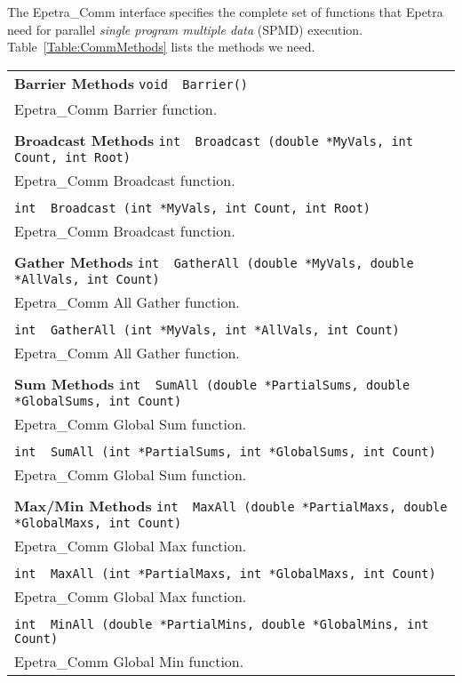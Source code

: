 \documentclass[12pt,relax]{EpetraUserGuide}
\newcommand{\comm}{Epetra\_Comm}
\begin{document}
The \comm{} interface specifies the complete set of functions that Epetra need
for parallel {\it single program multiple data} (SPMD) execution.
Table~\ref{Table:CommMethods} lists the methods we need.
\begin{table}
\begin{center}
\begin{tabular}{ | p{15cm} | }
\hline
{\bf Barrier Methods}
\verb!void  Barrier()!\\
  \comm{} Barrier function.\\
\\ 
{\bf Broadcast Methods }
\verb!int  Broadcast (double *MyVals, int Count, int Root)!\\
  \comm{} Broadcast function. \\
\\
\verb!int  Broadcast (int *MyVals, int Count, int Root)!\\
  \comm{} Broadcast function. \\
\\ 
{\bf Gather Methods }
\verb!int  GatherAll (double *MyVals, double *AllVals, int Count)!\\
  \comm{} All Gather function. \\
\\ 
\verb!int  GatherAll (int *MyVals, int *AllVals, int Count)!\\
  \comm{} All Gather function. \\
\\ 
{\bf Sum Methods }
\verb!int  SumAll (double *PartialSums, double *GlobalSums, int Count)!\\
  \comm{} Global Sum function. \\
 \\
\verb!int  SumAll (int *PartialSums, int *GlobalSums, int Count)!\\
  \comm{} Global Sum function. \\
 \\
{\bf Max/Min Methods }
\verb!int  MaxAll (double *PartialMaxs, double *GlobalMaxs, int Count)!\\
  \comm{} Global Max function. \\
 \\
\verb!int  MaxAll (int *PartialMaxs, int *GlobalMaxs, int Count)!\\
  \comm{} Global Max function. \\
 \\
\verb!int  MinAll (double *PartialMins, double *GlobalMins, int Count)!\\
  \comm{} Global Min function. \\

\end{tabular}
\end{center}
\end{table}
\end{document}
